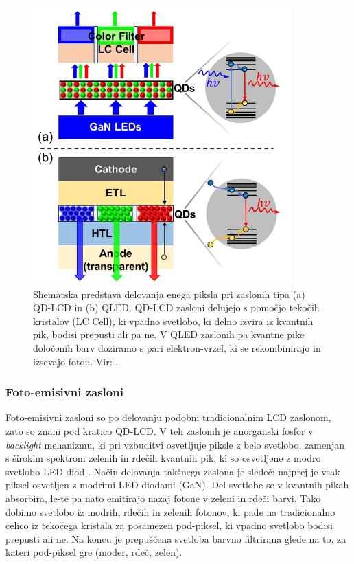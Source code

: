 \documentclass[twoside,11pt]{article}
\begin{document}
\begin{figure}[H]
   \begin{center}
       \includegraphics[width=10cm]{figures/zasloni.png}
       \caption{Shematska predstava delovanja enega piksla pri zaslonih tipa (a) QD-LCD in (b) QLED. QD-LCD zasloni delujejo s pomočjo tekočih kristalov (LC Cell), ki vpadno svetlobo, ki delno izvira iz kvantnih pik, bodisi prepusti ali pa ne. V QLED zaslonih pa kvantne pike določenih barv doziramo s pari elektron-vrzel, ki se rekombinirajo in izsevajo foton. Vir: \cite{https://doi.org/10.1002/anie.202004857}.}
       \label{fig:zasloni}
   \end{center}
\end{figure}

\subsubsection{Foto-emisivni zasloni}
Foto-emisivni zasloni so po delovanju podobni tradicionalnim LCD zaslonom, zato so znani pod kratico QD-LCD. V teh zaslonih je anorganski
fosfor v \textit{backlight} mehanizmu, ki pri vzbuditvi osvetljuje piksle z belo svetlobo, zamenjan s širokim spektrom zelenih in rdečih kvantnih pik, ki so osvetljene z modro svetlobo LED diod \cite{https://doi.org/10.1002/anie.202004857}. Način delovanja takšnega zaslona je sledeč: najprej je vsak
piksel osvetljen z modrimi LED diodami (GaN). Del svetlobe se v kvantnih pikah absorbira, le-te pa nato emitirajo nazaj fotone v zeleni in rdeči barvi. Tako
dobimo svetlobo iz modrih, rdečih in zelenih fotonov, ki pade na tradicionalno celico iz tekočega kristala za posamezen pod-piksel, ki vpadno svetlobo bodisi prepusti ali ne. 
Na koncu je prepuščena svetloba barvno filtrirana glede na to, za kateri pod-piksel gre (moder, rdeč, zelen). 
\end{document}
